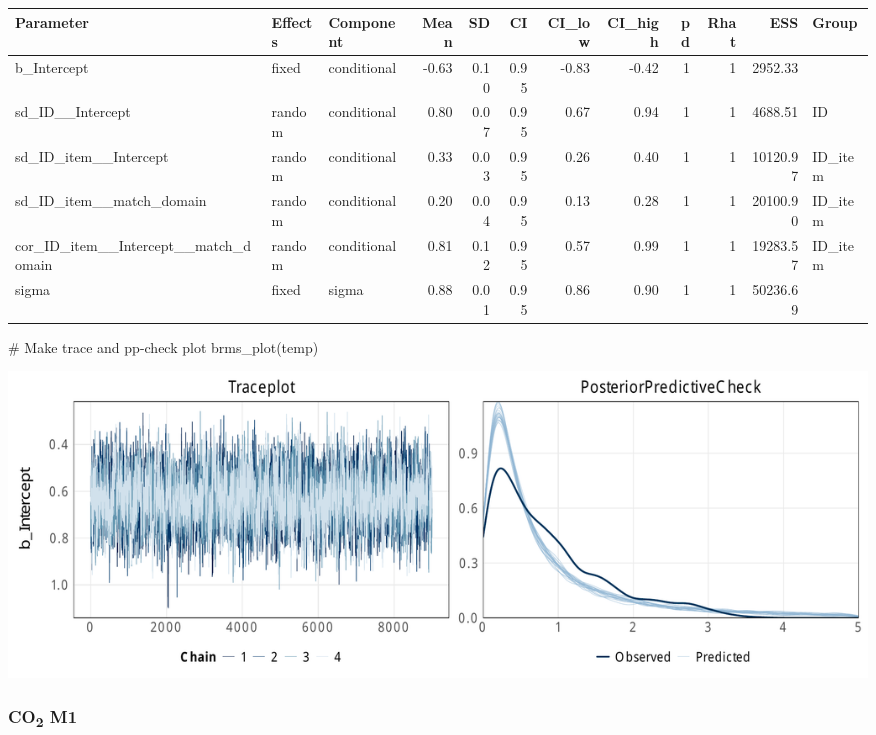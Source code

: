 \documentclass[
  letterpaper,
  DIV=11,
  numbers=noendperiod]{scrartcl}
\newenvironment{Shaded}{\begin{snugshade}}{\end{snugshade}}
\newcommand{\AttributeTok}[1]{\textcolor[rgb]{0.40,0.45,0.13}{#1}}
\newcommand{\CommentTok}[1]{\textcolor[rgb]{0.37,0.37,0.37}{#1}}
\newcommand{\FunctionTok}[1]{\textcolor[rgb]{0.28,0.35,0.67}{#1}}
\newcommand{\NormalTok}[1]{\textcolor[rgb]{0.00,0.23,0.31}{#1}}
\newcommand{\OtherTok}[1]{\textcolor[rgb]{0.00,0.23,0.31}{#1}}
\newcommand{\SpecialCharTok}[1]{\textcolor[rgb]{0.37,0.37,0.37}{#1}}
\newcommand{\StringTok}[1]{\textcolor[rgb]{0.13,0.47,0.30}{#1}}
\begin{document}
\begin{longtable*}[t]{lllrrrrrrrrl}
\toprule
Parameter & Effects & Component & Mean & SD & CI & CI\_low & CI\_high & pd & Rhat & ESS & Group\\
\midrule
b\_Intercept & fixed & conditional & -0.63 & 0.10 & 0.95 & -0.83 & -0.42 & 1 & 1 & 2952.33 & \\
sd\_ID\_\_Intercept & random & conditional & 0.80 & 0.07 & 0.95 & 0.67 & 0.94 & 1 & 1 & 4688.51 & ID\\
sd\_ID\_item\_\_Intercept & random & conditional & 0.33 & 0.03 & 0.95 & 0.26 & 0.40 & 1 & 1 & 10120.97 & ID\_item\\
sd\_ID\_item\_\_match\_domain & random & conditional & 0.20 & 0.04 & 0.95 & 0.13 & 0.28 & 1 & 1 & 20100.90 & ID\_item\\
cor\_ID\_item\_\_Intercept\_\_match\_domain & random & conditional & 0.81 & 0.12 & 0.95 & 0.57 & 0.99 & 1 & 1 & 19283.57 & ID\_item\\
\addlinespace
sigma & fixed & sigma & 0.88 & 0.01 & 0.95 & 0.86 & 0.90 & 1 & 1 & 50236.69 & \\
\bottomrule
\end{longtable*}

\begin{Shaded}
\begin{Highlighting}[]
\CommentTok{\# Make trace and pp{-}check plot}
\FunctionTok{brms\_plot}\NormalTok{(temp)}
\end{Highlighting}
\end{Shaded}

\includegraphics{supplement_files/figure-pdf/h1aM0CO2-1.pdf}

\subsubsection{\texorpdfstring{CO\textsubscript{2}
M1}{CO2 M1}}\label{co2-m1}

\begin{Shaded}
\end{Shaded}
\end{document}
